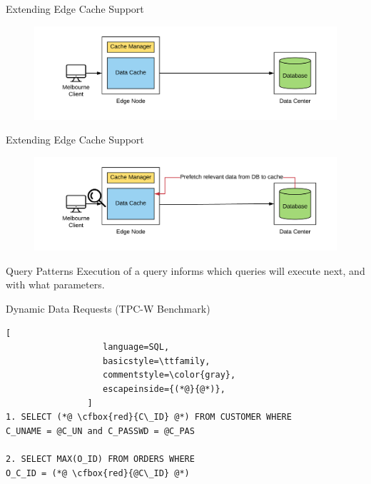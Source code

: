 \documentclass[10pt]{beamer}
\newcommand{\cfbox}[2]{%
    \colorlet{currentcolor}{.}%
    {\color{#1}%
    \fbox{\color{currentcolor}#2}}%
}
\begin{document}
\begin{frame}{Extending Edge Cache Support}
    \begin{figure}
        \center
        \hspace*{-1.5cm}
        \includegraphics[scale=0.17]{apollo_ec_dbl}
    \end{figure}
\end{frame}

\begin{frame}{Extending Edge Cache Support}
    \begin{figure}
        \center
        \hspace*{-1.5cm}
        \includegraphics[scale=0.17]{apollo_ec_dbl_learn}
    \end{figure}
\end{frame}

\begin{frame}{Query Patterns}
    Execution of a query informs which queries will execute next, and
    with what parameters.
\end{frame}

\begin{frame}[fragile]{Dynamic Data Requests (TPC-W Benchmark)}
    \begin{lstlisting}[
                   language=SQL,
                   basicstyle=\ttfamily,
                   commentstyle=\color{gray},
                   escapeinside={(*@}{@*)},
                ]
1. SELECT (*@ \cfbox{red}{C\_ID} @*) FROM CUSTOMER WHERE 
C_UNAME = @C_UN and C_PASSWD = @C_PAS

2. SELECT MAX(O_ID) FROM ORDERS WHERE
O_C_ID = (*@ \cfbox{red}{@C\_ID} @*)
    \end{lstlisting}

\begin{center}
\end{center}
\end{frame}
\end{document}
